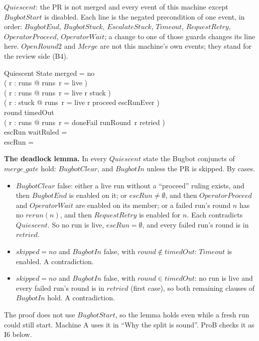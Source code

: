 \documentclass{article}
\begin{document}
$Quiescent$: the PR is not merged and every event of this machine except
$BugbotStart$ is disabled. Each line is the negated precondition of one
event, in order: $BugbotEnd$, $BugbotStuck$, $EscalateStuck$, $Timeout$,
$RequestRetry$, $OperatorProceed$, $OperatorWait$; a change to one of those
guards changes its line here. $OpenRound2$ and $Merge$ are not this machine's
own events; they stand for the review side (B4).

\begin{schema}{Quiescent}
  State
\where
  merged = no \\
  \lnot ( \exists r : \dom runs @ runs~r = live ) \\
  \lnot ( \exists r : \dom runs @ runs~r = live \land r \notin stuck ) \\
  \lnot ( \exists r : stuck @ runs~r = live \land r \notin proceed \cup escRunEver ) \\
  round \in timedOut \\
  \lnot ( \exists r : \dom runs @ runs~r = doneFail \land runRound~r \notin retried ) \\
  escRun \cup waitRuled = \emptyset \\
  escRun = \emptyset
\end{schema}

\textbf{The deadlock lemma.} In every $Quiescent$ state the Bugbot conjuncts
of $merge\_gate$ hold: $BugbotClear$, and $BugbotIn$ unless the PR is skipped.
By cases.
\begin{itemize}
\item $BugbotClear$ false: either a live run without a ``proceed'' ruling
  exists, and then $BugbotEnd$ is enabled on it; or $escRun \neq \emptyset$,
  and then $OperatorProceed$ and $OperatorWait$ are enabled on its member; or
  a failed run's round $n$ has no $rerun(n)$, and then $RequestRetry$ is
  enabled for $n$. Each contradicts $Quiescent$. So no run is live,
  $escRun = \emptyset$, and every failed run's round is in $retried$.
\item $skipped = no$ and $BugbotIn$ false, with $round \notin timedOut$:
  $Timeout$ is enabled. A contradiction.
\item $skipped = no$ and $BugbotIn$ false, with $round \in timedOut$: no run
  is live and every failed run's round is in $retried$ (first case), so both
  remaining clauses of $BugbotIn$ hold. A contradiction.
\end{itemize}
The proof does not use $BugbotStart$, so the lemma holds even while a fresh
run could still start. Machine A uses it in ``Why the split is sound''.
ProB checks it as I6 below.
\end{document}
